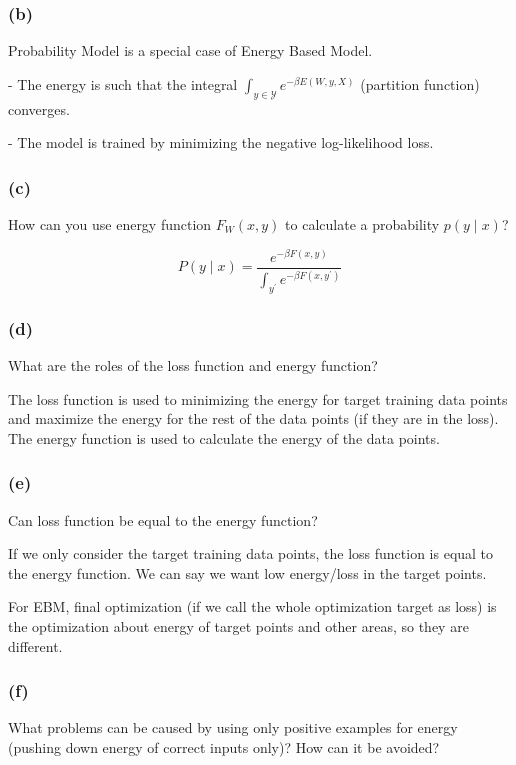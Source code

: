 \subsubsection*{(b)}
Probability Model is a special case of Energy Based Model.

- The energy is such that the integral $\int_{y \in \mathcal{Y}} e^{-\beta E(W, y, X)}$ (partition function) converges.

- The model is trained by minimizing the negative log-likelihood loss.

\subsubsection*{(c)}
How can you use energy function $F_W(x, y)$ to calculate a probability $p(y \mid x)$?

\begin{equation}
    P(y \mid x)=\frac{e^{-\beta F(x, y)}}{\int_{y^{\prime}} e^{-\beta F\left(x, y^{\prime}\right)}}
\end{equation}

\subsubsection*{(d)}
What are the roles of the loss function and energy function?

The loss function is used to minimizing the energy for target training data points and maximize the energy for the rest of the data points (if they are in the loss).
The energy function is used to calculate the energy of the data points.


\subsubsection*{(e)}
Can loss function be equal to the energy function?

If we only consider the target training data points, the loss function is equal to the energy function. We can say we want low energy/loss in the target points.

For EBM, final optimization (if we call the whole optimization target as   loss) is the optimization about energy of target points and other areas, so they are different.

\subsubsection*{(f)}
What problems can be caused by using only positive examples for energy (pushing down energy of correct inputs only)? How can it be avoided?

